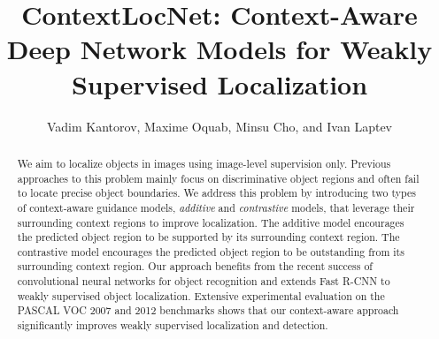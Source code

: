 \documentclass[runningheads]{llncs}
\begin{document}

\newcommand{\etal}{\textit{et al}.}
\newcommand{\ie}{\textit{i}.\textit{e}., }
\newcommand{\eg}{\textit{e}.\textit{g}.}

\pagestyle{headings}
\mainmatter

\def\fixme#1{\textcolor{red}{[#1]}\marginpar{\textcolor{red}{FIXME}}}

\def\checked#1{#1}

\title{ContextLocNet: Context-Aware Deep Network Models for Weakly Supervised Localization} %


\authorrunning{V. Kantorov \etal}

\author{Vadim Kantorov, Maxime Oquab, Minsu Cho, and Ivan Laptev}




\maketitle

\begin{abstract}
We aim to localize objects in images using image-level supervision only.
Previous approaches to this problem mainly focus on discriminative object
regions and often fail to locate precise object boundaries. 
We address this problem by introducing two types of context-aware guidance models, {\em additive
} and {\em contrastive} models, that leverage their surrounding context regions to improve localization. 
The additive model encourages the predicted object region to be
supported by its surrounding context region. 
The contrastive model encourages the
predicted object region to be outstanding from its surrounding context region.
Our approach benefits from the recent success of convolutional neural networks
for object recognition and extends Fast R-CNN to weakly supervised object localization.
Extensive experimental evaluation on the PASCAL VOC 2007 and 2012 benchmarks shows that our context-aware approach significantly improves weakly supervised localization and detection.

\end{abstract}
\end{document}
